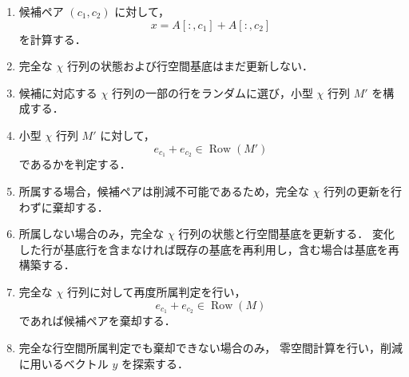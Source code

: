 \begin{enumerate}
    \item 候補ペア $(c_1,c_2)$ に対して，
    \[
        x = A[:,c_1] + A[:,c_2]
    \]
    を計算する．

    \item 完全な $\chi$ 行列の状態および行空間基底はまだ更新しない．

    \item 候補に対応する $\chi$ 行列の一部の行をランダムに選び，小型 $\chi$ 行列 $M'$ を構成する．

    \item 小型 $\chi$ 行列 $M'$ に対して，
    \[
        e_{c_1}+e_{c_2} \in \operatorname{Row}(M')
    \]
    であるかを判定する．

    \item 所属する場合，候補ペアは削減不可能であるため，完全な $\chi$ 行列の更新を行わずに棄却する．

    \item 所属しない場合のみ，完全な $\chi$ 行列の状態と行空間基底を更新する．
    変化した行が基底行を含まなければ既存の基底を再利用し，含む場合は基底を再構築する．

    \item 完全な $\chi$ 行列に対して再度所属判定を行い，
    \[
        e_{c_1}+e_{c_2} \in \operatorname{Row}(M)
    \]
    であれば候補ペアを棄却する．

    \item 完全な行空間所属判定でも棄却できない場合のみ，
    零空間計算を行い，削減に用いるベクトル $y$ を探索する．
\end{enumerate}

